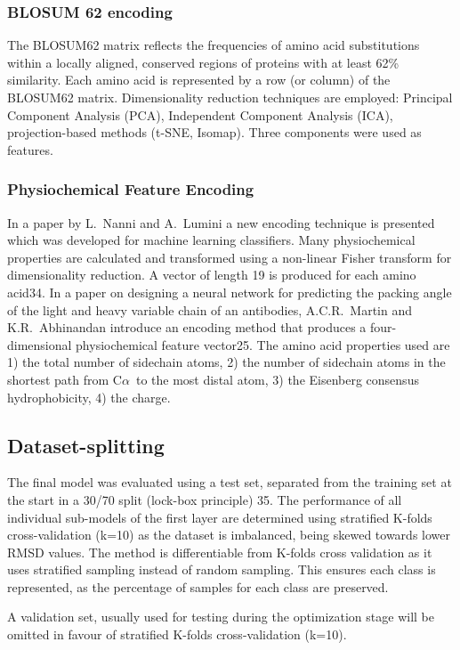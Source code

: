 \documentclass[12pt]{article}
\newcommand{\ca}{\mbox{C$\alpha$}}
\begin{document}
\subsubsection{BLOSUM 62 encoding}
The BLOSUM62 matrix reflects the frequencies of amino acid
substitutions within a locally aligned, conserved regions of proteins
with at least 62\% similarity. Each amino acid is represented by a row
(or column) of the BLOSUM62 matrix. Dimensionality reduction
techniques are employed: Principal Component Analysis (PCA),
Independent Component Analysis (ICA), projection-based methods (t-SNE,
Isomap). Three components were used as features.

\subsubsection{Physiochemical Feature Encoding}
In a paper by L.~Nanni and A.~Lumini a new encoding technique is
presented which was developed for machine learning classifiers. Many
physiochemical properties are calculated and transformed using a
non-linear Fisher transform for dimensionality reduction.  A vector of
length 19 is produced for each amino acid34.  In a paper on designing
a neural network for predicting the packing angle of the light and
heavy variable chain of an antibodies, A.C.R.~Martin and
K.R.~Abhinandan introduce an encoding method that produces a
four-dimensional physiochemical feature vector25. The amino acid
properties used are 1) the total number of sidechain atoms, 2) the
number of sidechain atoms in the shortest path from \ca\ to the most
distal atom, 3) the Eisenberg consensus
hydrophobicity\cite{Eisenberg1982}, 4) the charge.

\subsection{Dataset-splitting}
The final model was evaluated using a test set, separated from the
training set at the start in a 30/70 split (lock-box principle)
35. The performance of all individual sub-models of the first layer
are determined using stratified K-folds cross-validation (k=10) as the
dataset is imbalanced, being skewed towards lower RMSD values. The
method is differentiable from K-folds cross validation as it uses
stratified sampling instead of random sampling. This ensures each
class is represented, as the percentage of samples for each class are
preserved.

A validation set, usually used for testing during the optimization
stage will be omitted in favour of stratified K-folds cross-validation
(k=10)\cite{Krstajic2014,Kohavi1995}.
\end{document}
